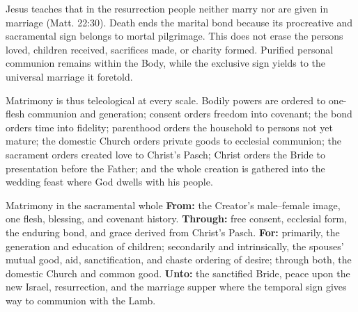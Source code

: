 Jesus teaches that in the resurrection people neither marry nor are given in marriage (Matt. 22:30). Death ends the marital bond because its procreative and sacramental sign belongs to mortal pilgrimage. This does not erase the persons loved, children received, sacrifices made, or charity formed. Purified personal communion remains within the Body, while the exclusive sign yields to the universal marriage it foretold.

Matrimony is thus teleological at every scale. Bodily powers are ordered to one-flesh communion and generation; consent orders freedom into covenant; the bond orders time into fidelity; parenthood orders the household to persons not yet mature; the domestic Church orders private goods to ecclesial communion; the sacrament orders created love to Christ's Pasch; Christ orders the Bride to presentation before the Father; and the whole creation is gathered into the wedding feast where God dwells with his people.

\begin{massbox}{Matrimony in the sacramental whole}
\textbf{From:} the Creator's male--female image, one flesh, blessing, and covenant history. \textbf{Through:} free consent, ecclesial form, the enduring bond, and grace derived from Christ's Pasch. \textbf{For:} primarily, the generation and education of children; secondarily and intrinsically, the spouses' mutual good, aid, sanctification, and chaste ordering of desire; through both, the domestic Church and common good. \textbf{Unto:} the sanctified Bride, peace upon the new Israel, resurrection, and the marriage supper where the temporal sign gives way to communion with the Lamb.
\end{massbox}
